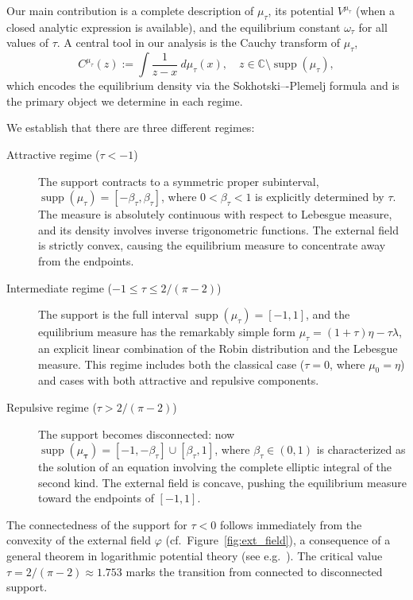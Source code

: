 \documentclass[reqno,11pt]{amsart}
\theoremstyle{plain}
\theoremstyle{definition}
\theoremstyle{remark}
\numberwithin{equation}{section}
\DeclareMathOperator{\supp}{supp}
\begin{document}
Our main contribution is a complete description of $\mu_\tau$, its potential $V^{\mu_\tau}$ (when a closed analytic expression is available), and the equilibrium constant $\omega_\tau$ for all values of $\tau$. A central tool in our analysis is the Cauchy transform of $\mu_\tau$,
\begin{equation*}
    \label{CauchyTransf}
       C^{\mu_\tau}(z):=\int\frac{1}{z-x}\ d{\mu_\tau}(x),\quad z\in\mathbb{C}\setminus \supp({\mu_\tau}),
\end{equation*}
which encodes the equilibrium density via the Sokhotski–-Plemelj formula and is the primary object we determine in each regime.

We establish that there are three different regimes:
\begin{description}
    \item[Attractive regime ($\tau<-1$)] The support contracts to a symmetric proper subinterval,  $\supp \left(\mu_\tau\right)=\left[-\beta_\tau, \beta_\tau\right]$, where $0<\beta_\tau<1$ is explicitly determined by $\tau$. The measure is absolutely continuous with respect to Lebesgue measure, and its density involves inverse trigonometric functions. The external field is strictly convex, causing the equilibrium measure to concentrate away from the endpoints.
    
    \item[Intermediate regime ($-1\le \tau\le  2/(\pi-2)$)] The support is the full interval $\supp\left(\mu_\tau\right)= [-1,1]$, and the equilibrium measure has the remarkably simple form $\mu_\tau=(1+\tau) \eta-\tau \lambda$, an explicit linear combination of the Robin distribution and the Lebesgue measure. This regime includes both the classical case ($\tau=0$, where $\mu_0=\eta$) and cases with both attractive and repulsive components. 
    
    \item[Repulsive regime ($\tau>2/(\pi-2)$)] The support becomes disconnected: now $\supp (\mu_\mathbf{\tau})= [-1,-\beta_\tau] \cup [\beta _\tau, 1]$, where $\beta_\tau \in(0,1)$ is characterized as the solution of an equation involving the complete elliptic integral of the second kind. The external field is concave, pushing the equilibrium measure toward the endpoints of $[-1,1]$. 
\end{description}
The connectedness of the support for $\tau<0$ follows immediately from the convexity of the external field $\varphi$ (cf.~Figure~\ref{fig:ext_field}), a consequence of a general theorem in logarithmic potential theory (see e.g.~\cite[Theorem IV.1.10]{Saff:97}). The critical value $\tau=2 /(\pi-2) \approx 1.753$ marks the transition from connected to disconnected support.
\end{document}
